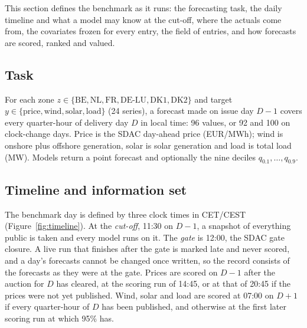\documentclass[11pt,a4paper]{article}
\begin{document}
This section defines the benchmark as it runs: the forecasting task, the daily timeline and what a model may know at
the cut-off, where the actuals come from, the covariates frozen for every entry, the field of entries, and how
forecasts are scored, ranked and valued.

\subsection{Task}

For each zone $z \in \{\text{BE}, \text{NL}, \text{FR}, \text{DE-LU}, \text{DK1}, \text{DK2}\}$ and target $y \in
\{\text{price}, \text{wind}, \text{solar}, \text{load}\}$ (24 series), a forecast made on issue day $D-1$ covers
every quarter-hour of delivery day $D$ in local time: 96 values, or 92 and 100 on clock-change days. Price is the SDAC
day-ahead price (EUR/MWh); wind is onshore plus offshore generation, solar is solar generation and load is total load
(MW). Models return a point forecast and optionally the nine deciles $q_{0.1},\dots,q_{0.9}$.

\subsection{Timeline and information set}

The benchmark day is defined by three clock times in CET/CEST (Figure~\ref{fig:timeline}). At the \emph{cut-off},
11:30 on $D-1$, a snapshot of everything public is taken and every model runs on it. The \emph{gate} is 12:00, the
SDAC gate closure. A live run that finishes after the gate is marked late and never scored, and a day's forecasts
cannot be changed once written, so the record consists of the forecasts as they were at the gate. Prices are scored on
$D-1$ after the auction for $D$ has cleared, at the scoring run of 14:45, or at that of 20:45 if the prices were not yet
published. Wind, solar and load are scored at 07:00 on $D+1$ if every quarter-hour of $D$ has been published, and
otherwise at the first later scoring run at which 95\% has.
\end{document}
